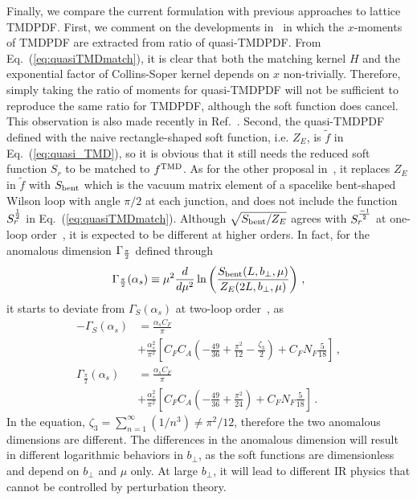 \documentclass[aps,rmp,reprint,amsmath,amssymb,graphicx,longbibliography]{revtex4-1} %
\newcommand{\nn}{\nonumber}
\DeclareRobustCommand{\eq}[1]{Eq.~(\ref{eq:#1})}
\begin{document}
Finally, we compare the current formulation with previous approaches to lattice TMDPDF. First, we comment on the developments in~\cite{Hagler:2009mb,Musch:2010ka,Musch:2011er,Engelhardt:2015xja,Yoon:2017qzo} in which the $x$-moments of TMDPDF are extracted from ratio of quasi-TMDPDF.  From Eq.~(\ref{eq:quasiTMDmatch}), it is clear that both the matching kernel $H$ and the exponential factor of Collins-Soper kernel depends on $x$ non-trivially. Therefore, simply taking the ratio of moments for quasi-TMDPDF will not be sufficient to reproduce the same ratio for TMDPDF, although the soft function does cancel. This observation is also made recently in Ref.~\cite{Ebert:2020gxr}. Second, the quasi-TMDPDF defined with the naive rectangle-shaped soft function, i.e. $Z_E$, is $\tilde f$ in \eq{quasi_TMD}, so it is obvious that it still needs the reduced soft function $S_r$ to be matched to $f^{\rm TMD}$. As for the other proposal in~\cite{Ji:2014hxa,Ebert:2019okf}, it replaces $Z_E$ in $\tilde f$ with $S_{\rm bent}$ which is the vacuum matrix element of a spacelike bent-shaped Wilson loop with angle $\pi/2$ at each junction, and does not include the function $S^{1\over2}_r$ in \eq{quasiTMDmatch}. Although $\sqrt{S_{\rm bent}/Z_E}$ agrees with $S_r^{-1\over2}$ at one-loop order~\cite{Ji:2018hvs,Ebert:2019okf}, it is expected to be different at higher orders. In fact, for the anomalous dimension $\Gamma_{\pi\over2}$ defined through
\begin{align}
	\Gamma_{\frac{\pi}{2}}(\alpha_s) \equiv \mu^2\frac{d}{d\mu^2} \ln \left(\frac{S_{\rm bent}(L,b_\perp,\mu)}{Z_E(2L,b_\perp,\mu)}\right) \,,
\end{align}
it starts to deviate from $\Gamma_S(\alpha_s)$ at two-loop order~\cite{Grozin:2015kna}, as
\begin{align}
	-\Gamma_S(\alpha_s)&=\frac{\alpha_sC_F}{\pi} \\
	&+\frac{\alpha_s^2}{\pi^2}\left[C_FC_A\left(-\frac{49}{36}+\frac{\pi^2}{12}-\frac{\zeta_3}{2}\right)+C_FN_F\frac{5}{18}\right]  \,, \nn \\
	\Gamma_{\frac{\pi}{2}}(\alpha_s)&=\frac{\alpha_sC_F}{\pi} \\
	&+\frac{\alpha_s^2}{\pi^2}\left[C_FC_A\left(-\frac{49}{36}+\frac{\pi^2}{24}\right)+C_FN_F\frac{5}{18}\right] \,. \nn
\end{align}
In the equation, $\zeta_3=\sum_{n=1}^{\infty}(1/n^3) \ne \pi^2/12$, therefore the two anomalous dimensions are different. The differences in the anomalous dimension will result in different logarithmic behaviors in $b_\perp$, as the soft functions are dimensionless and depend on $b_\perp$ and $\mu$ only. At large $b_\perp$, it will lead to different IR physics that cannot be controlled by perturbation theory.
\end{document}
